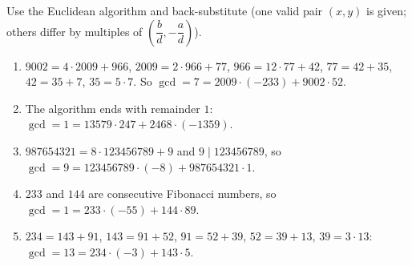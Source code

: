 Use the Euclidean algorithm and back-substitute (one valid pair $(x,y)$ is given; others differ by multiples of $\left(\dfrac {b}{d},-\dfrac {a}{d}\right)$).
\begin{enumerate}
\item[(i)] $9002=4\cdot2009+966$, $2009=2\cdot966+77$, $966=12\cdot77+42$, $77=42+35$, $42=35+7$, $35=5\cdot7$. So $\gcd=7=2009\cdot(-233)+9002\cdot52$.
\item[(ii)] The algorithm ends with remainder $1$: $\gcd=1=13579\cdot247+2468\cdot(-1359)$.
\item[(iii)] $987654321=8\cdot123456789+9$ and $9\mid123456789$, so $\gcd=9=123456789\cdot(-8)+987654321\cdot1$.
\item[(iv)] $233$ and $144$ are consecutive Fibonacci numbers, so $\gcd=1=233\cdot(-55)+144\cdot89$.
\item[(v)] $234=143+91$, $143=91+52$, $91=52+39$, $52=39+13$, $39=3\cdot13$: $\gcd=13=234\cdot(-3)+143\cdot5$.
\end{enumerate}
